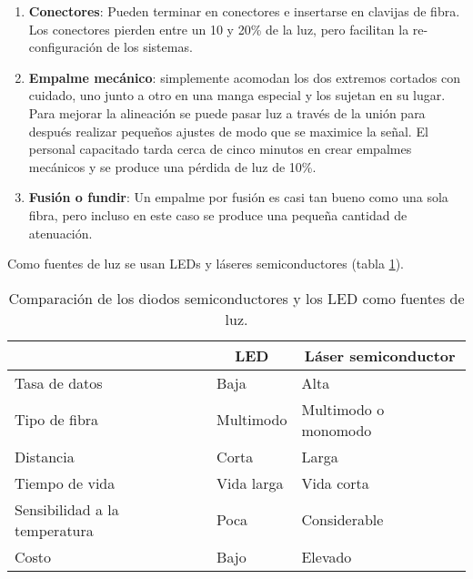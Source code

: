 \documentclass[
	12pt, %
	fleqn, %
	a4paper, %
]{LegrandOrangeBook}
\begin{document}
\begin{enumerate}
\item \textbf{Conectores}: Pueden terminar en conectores e insertarse en clavijas de fibra. Los conectores pierden entre un 10 y 20\% de la luz, pero facilitan la re-configuración de los sistemas.
\item \textbf{Empalme mecánico}: simplemente acomodan
los dos extremos cortados con cuidado, uno junto a otro en una manga especial y los sujetan en su lugar. Para mejorar la alineación se puede pasar luz a través de la unión para después realizar pequeños ajustes de modo que se maximice la señal. El personal capacitado tarda cerca de cinco minutos en crear empalmes mecánicos y se produce una pérdida de luz de 10\%.
\item \textbf{Fusión o fundir}: Un empalme por fusión es casi tan bueno como una sola fibra, pero incluso en este caso se produce una pequeña cantidad de atenuación.
\end{enumerate}
Como fuentes de luz se usan LEDs y láseres semiconductores (tabla \ref{tab:led vs laser}).
\begin{table}[]
\centering
\begin{tabular}{|l|l|l|}
\hline
\rowcolor[HTML]{CBCEFB} 
\multicolumn{1}{|c|}{\cellcolor[HTML]{CBCEFB}Característica} & \multicolumn{1}{c|}{\cellcolor[HTML]{CBCEFB}LED} & \multicolumn{1}{c|}{\cellcolor[HTML]{CBCEFB}Láser semiconductor} \\ \hline
Tasa de datos                                                & Baja                                             & Alta                                                             \\ \hline
Tipo de fibra                                                & Multimodo                                        & Multimodo o monomodo                                             \\ \hline
Distancia                                                    & Corta                                            & Larga                                                            \\ \hline
Tiempo de vida                                               & Vida larga                                       & Vida corta                                                       \\ \hline
Sensibilidad a la temperatura                                & Poca                                             & Considerable                                                     \\ \hline
Costo                                                        & Bajo                                             & Elevado                                                          \\ \hline
\end{tabular}
\caption{Comparación de los diodos semiconductores y los LED como fuentes de luz.}
\label{tab:led vs laser}
\end{table}
\end{document}
